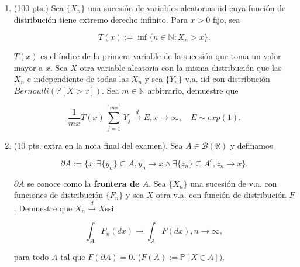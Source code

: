 \documentclass[letterpaper]{article}
\theoremstyle{definition}
\theoremstyle{lemathm}
\theoremstyle{lemathm}
\theoremstyle{lemademthm}
\newcommand{\bracs}[1]{\left[ #1 \right] }
\newcommand{\ceil}[1]{\left \lceil #1 \right\rceil }
\newcommand{\N}{\mathbb{N}}
\newcommand{\R}{\mathbb{R}}
\newcommand{\PP}{\mathbb{P}}
\newcommand{\1}{\mathbbm{1}}
\begin{document}
\begin{enumerate}
		\newpage

		\item (100 pts.) Sea $\{X_n\}$ una sucesión de variables aleatorias iid cuya función de distribución tiene extremo derecho infinito. Para $x>0$ fijo, sea

		\[T(x):=\inf\{n\in\N :X_n>x\}.\]

		$T(x)$ es el índice de la primera variable de la sucesión que toma un valor mayor a $x$. Sea $X$ otra variable aleatoria con la misma distribución que las $X_n$ e independiente de todas las $X_n$ y sea $\{Y_n\}$ v.a. iid con distribución $Bernoulli(\PP\bracs{X>x})$. Sea $m\in\N$ arbitrario, demuestre que 
		
		\[ \frac{1}{mx}T(x)\sum_{j=1}^{\ceil{mx}}Y_j\overset{d}{\to} E,x\to\infty,\quad E\sim exp(1).\]

		\newpage

		\item (10 pts. extra en la nota final del examen). Sea $A\in\mathcal{B}(\R)$ y definamos
		
		\[\partial A:=\{x:\exists \{y_n\}\subseteq A, y_n\to x\wedge \exists \{z_n\}\subseteq A^c, z_n\to x\}.\]

		$\partial A$ se conoce como la \textbf{frontera de $A$}. Sea $\{X_n\}$ una sucesión de v.a. con funciones de distribución $\{F_n\}$ y sea $X$ otra v.a. con función de distribución $F$. Demuestre que $X_n\overset{d}{\to}X$ssi 

		\[\int_A F_n(dx)\to \int_A F(dx), n\to\infty,\]
		
		para todo $A$ tal que $F(\partial A)=0$. ($F(A):=\PP\bracs{X\in A})$.

    \end{enumerate}

	
\end{document}

